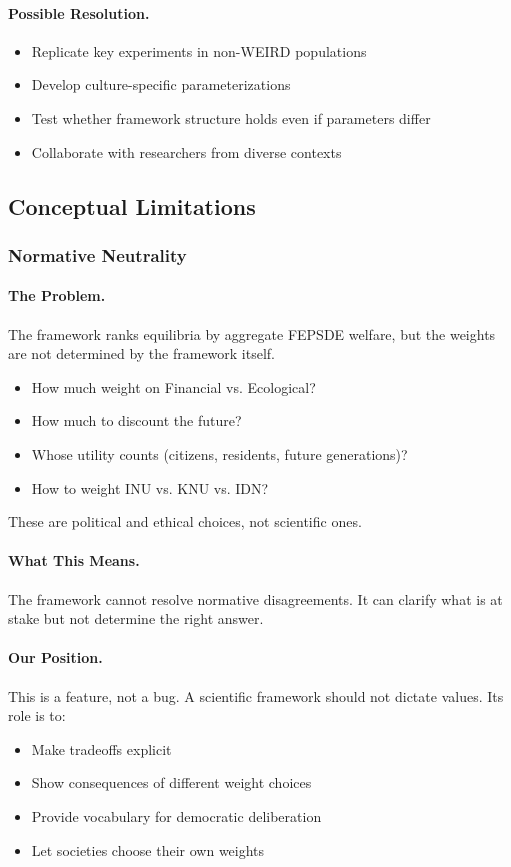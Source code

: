 \paragraph{Possible Resolution.}
\begin{itemize}
  \item Replicate key experiments in non-WEIRD populations
  \item Develop culture-specific parameterizations
  \item Test whether framework structure holds even if parameters differ
  \item Collaborate with researchers from diverse contexts
\end{itemize}

\subsection{Conceptual Limitations}

\subsubsection{Normative Neutrality}

\paragraph{The Problem.}
The framework ranks equilibria by aggregate FEPSDE welfare,
but the weights are not determined by the framework itself.

\begin{itemize}
  \item How much weight on Financial vs. Ecological?
  \item How much to discount the future?
  \item Whose utility counts (citizens, residents, future generations)?
  \item How to weight INU vs. KNU vs. IDN?
\end{itemize}

These are political and ethical choices, not scientific ones.

\paragraph{What This Means.}
The framework cannot resolve normative disagreements.
It can clarify what is at stake but not determine the right answer.

\paragraph{Our Position.}
This is a feature, not a bug. A scientific framework should not
dictate values. Its role is to:
\begin{itemize}
  \item Make tradeoffs explicit
  \item Show consequences of different weight choices
  \item Provide vocabulary for democratic deliberation
  \item Let societies choose their own weights
\end{itemize}

